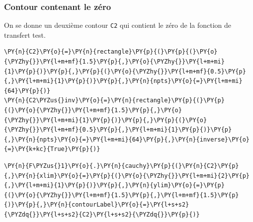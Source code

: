 \subsubsection{Contour contenant le zéro\label{contour-contenant-le-zuxe9ro}}
On se donne un deuxième contour \texttt{C2} qui contient le zéro de la
fonction de transfert test.
\begin{tcolorbox}[breakable, size=fbox, boxrule=1pt, pad at break*=1mm,colback=cellbackground, colframe=cellborder]
\begin{Verbatim}[commandchars=\\\{\}]
\PY{n}{C2}\PY{o}{=}\PY{n}{rectangle}\PY{p}{(}\PY{p}{(}\PY{o}{\PYZhy{}}\PY{l+m+mf}{1.5}\PY{p}{,}\PY{o}{\PYZhy{}}\PY{l+m+mi}{1}\PY{p}{)}\PY{p}{,}\PY{p}{(}\PY{o}{\PYZhy{}}\PY{l+m+mf}{0.5}\PY{p}{,}\PY{l+m+mi}{1}\PY{p}{)}\PY{p}{,}\PY{n}{npts}\PY{o}{=}\PY{l+m+mi}{64}\PY{p}{)}
\PY{n}{C2\PYZus{}inv}\PY{o}{=}\PY{n}{rectangle}\PY{p}{(}\PY{p}{(}\PY{o}{\PYZhy{}}\PY{l+m+mf}{1.5}\PY{p}{,}\PY{o}{\PYZhy{}}\PY{l+m+mi}{1}\PY{p}{)}\PY{p}{,}\PY{p}{(}\PY{o}{\PYZhy{}}\PY{l+m+mf}{0.5}\PY{p}{,}\PY{l+m+mi}{1}\PY{p}{)}\PY{p}{,}\PY{n}{npts}\PY{o}{=}\PY{l+m+mi}{64}\PY{p}{,}\PY{n}{inverse}\PY{o}{=}\PY{k+kc}{True}\PY{p}{)}
\end{Verbatim}
\end{tcolorbox}
\begin{tcolorbox}[breakable, size=fbox, boxrule=1pt, pad at break*=1mm,colback=cellbackground, colframe=cellborder]
\begin{Verbatim}[commandchars=\\\{\}]
\PY{n}{F\PYZus{}1}\PY{o}{.}\PY{n}{cauchy}\PY{p}{(}\PY{n}{C2}\PY{p}{,}\PY{n}{xlim}\PY{o}{=}\PY{p}{(}\PY{o}{\PYZhy{}}\PY{l+m+mi}{2}\PY{p}{,}\PY{l+m+mi}{1}\PY{p}{)}\PY{p}{,}\PY{n}{ylim}\PY{o}{=}\PY{p}{(}\PY{o}{\PYZhy{}}\PY{l+m+mf}{1.5}\PY{p}{,}\PY{l+m+mf}{1.5}\PY{p}{)}\PY{p}{,}\PY{n}{contourLabel}\PY{o}{=}\PY{l+s+s2}{\PYZdq{}}\PY{l+s+s2}{C2}\PY{l+s+s2}{\PYZdq{}}\PY{p}{)}
\end{Verbatim}
\end{tcolorbox}
